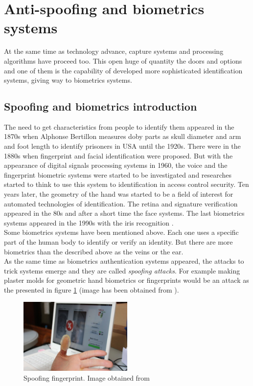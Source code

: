 \section{Anti-spoofing and biometrics systems}
At the same time as technology advance, capture systems and processing algorithms have proceed too. This open huge of quantity the doors and options and one of them is the capability of developed more sophisticated identification systems, giving way to biometrics systems.\\

\subsection{Spoofing and biometrics introduction}
The need to get characteristics from people to identify them appeared in the 1870s when Alphonse Bertillon measures doby parts as skull diameter and arm and foot length to identify prisoners in USA until the 1920s. There were in the 1880s when fingerprint and facial identification were proposed. But with the appearance of digital signals processing systems in 1960, the voice and the fingerprint biometric systems were started to be investigated and researches started to think to use this system to identification in access control security. Ten years later, the geometry of the hand was started to be a field of interest for automated technologies of identification. The retina and signature verification appeared in the 80s and after a short time the face systems. The last biometrics systems appeared in the 1990s with the iris recognition \cite{Intro_biometrics}.\\

Some biometrics systems have been mentioned above. Each one uses a specific part of the human body to identify or verify an identity. But there are more biometrics than the described above as the veins or the ear.\\

As the same time as biometrics authentication systems appeared, the attacks to trick systems emerge and they are called \textit{spoofing attacks}. For example making plaster molds for geometric hand biometrics or fingerprints would be an attack as the presented in figure \ref{fig:Spoof_fingerprint} (image has been obtained from \cite{fingerprint_image}).\\


\begin{figure}[htb]
\centering
\includegraphics[width=0.5\textwidth]{images_miscelaneus/spoofing_fingerprint.jpg}
\caption{Spoofing fingerprint. Image obtained from \cite{fingerprint_image}} \label{fig:Spoof_fingerprint}
\end{figure}

